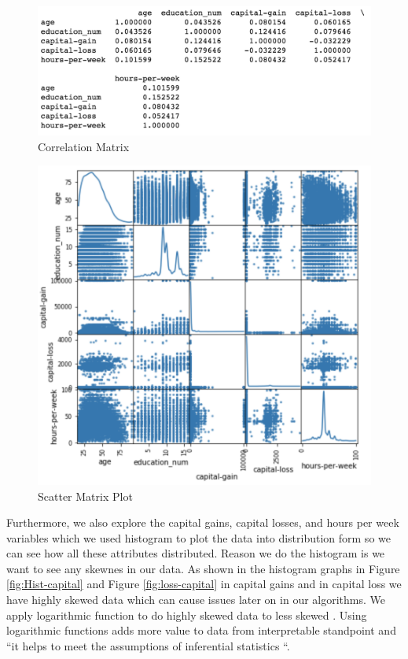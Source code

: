 \documentclass[sigconf]{acmart}
\begin{document}
 \begin{figure}[!ht]
  \centering
      \includegraphics[width=\columnwidth]{project/images/scatter.png}
  \caption{Correlation Matrix \cite{Borga2017}}\label{fig:scatter-matrix}
\end{figure}

 \begin{figure}[!ht]
  \centering
      \includegraphics[width=\columnwidth]{project/images/scatter-matrix.png}
  \caption{Scatter Matrix Plot \cite{Borga2017}}\label{fig:scatter}
\end{figure}

\par Furthermore, we also explore the capital gains, capital losses, and hours per week variables which we used histogram to plot the data into distribution form so we can see how all these attributes distributed. Reason we do the histogram is we want to see any skewnes in our data. As shown in the histogram graphs in Figure \ref{fig:Hist-capital} and  Figure \ref{fig:loss-capital} in capital gains and in capital loss we have highly skewed data  which can cause issues later on in our algorithms. We apply logarithmic function to do highly skewed data to less skewed \cite{www-onlinestat}. Using logarithmic functions adds more value to data from interpretable standpoint and ``it helps to meet the assumptions of inferential statistics \cite{www-onlinestat}``.
\end{document}
